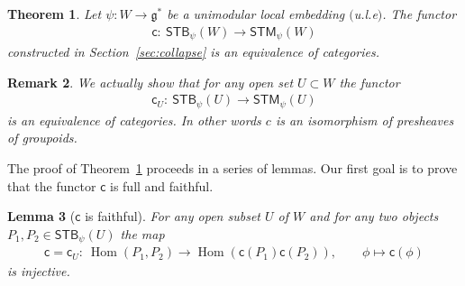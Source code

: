 \documentclass[pdftex]{sigma}
\numberwithin{equation}{section}
\newtheorem{Lemma}{Lemma}[section]
\newtheorem{Theorem}[Lemma]{Theorem}
\newtheorem{Remark}[Lemma]{Remark}
\begin{document}
\begin{Theorem}\label{thm:iso}
Let $\psi\colon W\to{\mathfrak g}^*$ be a unimodular local embedding $($u.l.e$)$.  The functor
\begin{gather*}
{\textsf{c}}\colon \  {\textsf{STB}}_\psi(W)\to {\textsf{STM}}_\psi (W)
\end{gather*}
constructed in Section~{\rm \ref{sec:collapse}} is an equivalence of
categories.
\end{Theorem}
\begin{Remark}
We actually show that for any open set $U\subset W$ the functor
\begin{gather*}
{\textsf{c}}_U\colon \  {\textsf{STB}}_\psi(U)\to {\textsf{STM}}_\psi (U)
\end{gather*}
is an equivalence of categories.  In other words $c$ is an isomorphism
of presheaves of groupoids.
\end{Remark}



  The proof of Theorem~\ref{thm:iso} proceeds in a series of lemmas.
Our f\/irst goal is to
  prove that the functor ${\textsf{c}}$ is full and faithful.

\begin{Lemma}[${\textsf{c}}$ is faithful] \label{lem4:1}
  For any open subset $U$ of $W$ and for any two objects $P_1, P_2 \in
  {\textsf{STB}}_\psi (U)$ the map
\begin{gather*}
{\textsf{c}}= {\textsf{c}}_U \colon  \ \operatorname{Hom}(P_1, P_2) \to \operatorname{Hom}({\textsf{c}}(P_1) {\textsf{c}}(P_2)), \qquad \phi\mapsto {\textsf{c}}(\phi)
\end{gather*}
is injective.
\end{Lemma}
\end{document}
